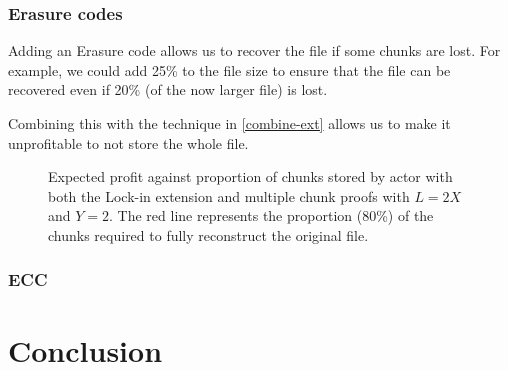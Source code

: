 \documentclass[10pt,twoside,a4paper]{article}
\begin{document}
\subsubsection{Erasure codes}

Adding an Erasure code allows us to recover the file if some chunks are lost.
For example, we could add 25\% to the file size to ensure that the file can be recovered even if 20\% (of the now larger file)
is lost.

Combining this with the technique in \ref{combine-ext} allows us to make it unprofitable to not store the whole file.

\begin{figure}[H]

\caption[Expected attacker profit: erasure code]{Expected profit against proportion of chunks stored by actor with both the Lock-in extension and multiple chunk proofs with $L = 2X$ and $Y = 2$.
The red line represents the proportion (80\%) of the chunks required to fully reconstruct the original file.}
\end{figure}

\subsubsection{ECC}

\section{Conclusion}


\printbibliography

\end{document}
